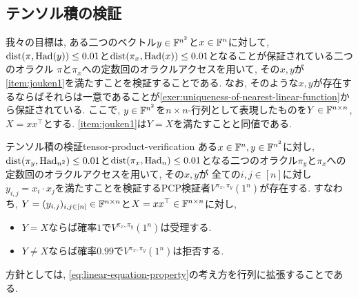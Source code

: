   \subsection{テンソル積の検証}
  我々の目標は, ある二つのベクトル$y\in\mathbb{F}^{n^2}$と$x\in\mathbb{F}^n$に対して, $\mathrm{dist}(\pi,\mathrm{Had}(y))\le 0.01$と$\mathrm{dist}(\pi_x,\mathrm{Had}(x))\le 0.01$となることが保証されている二つのオラクル
  $\pi$と$\pi_x$への定数回のオラクルアクセスを用いて, その$x,y$が
  \ref{item:jouken1}を満たすことを検証することである.
  なお, そのような$x,y$が存在するならばそれらは一意であることが\cref{exer:uniqueness-of-nearest-linear-function}から保証されている.
  ここで, $y\in\mathbb{F}^{n^2}$を$n\times n$-行列として表現したものを$Y\in\mathbb{F}^{n\times n}$, $X=xx^\top$とする. \ref{item:jouken1}は$Y=X$を満たすことと同値である.

  \begin{lemma}{テンソル積の検証}{tensor-product-verification}
    ある$x\in\mathbb{F}^n,y\in\mathbb{F}^{n^2}$に対し, $\mathrm{dist}(\pi_y,\mathrm{Had}_{n^2})\le 0.01$と$\mathrm{dist}(\pi_x,\mathrm{Had}_n)\le 0.01$となる二つのオラクル$\pi_y$と$\pi_x$への定数回のオラクルアクセスを用いて, その$x,y$が
    全ての$i,j\in [n]$に対し$y_{i,j}=x_i\cdot x_j$を満たすことを検証するPCP検証者$V^{\pi_x,\pi_y}(1^n)$が存在する.
    すなわち, $Y=(y_{i,j})_{i,j\in [n]}\in\mathbb{F}^{n\times n}$と$X=xx^\top \in \mathbb{F}^{n\times n}$に対し,
    \begin{itemize}
      \item $Y=X$ならば確率$1$で$V^{\pi_x,\pi_y}(1^n)$は受理する.
      \item $Y\ne X$ならば確率$0.99$で$V^{\pi_x,\pi_y}(1^n)$は拒否する.
    \end{itemize}
  \end{lemma}
    
  方針としては, \cref{eq:linear-equation-property}の考え方を行列に拡張することである.
  

